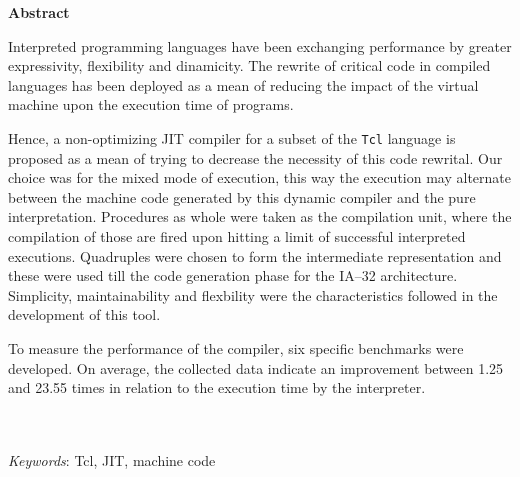 
{
\Large
\begin{center}
\textbf{Abstract}
\end{center}
}
Interpreted programming languages have been exchanging performance by
greater expressivity, flexibility and dinamicity. The rewrite of
critical code in compiled languages has been deployed as a mean of
reducing the impact of the virtual machine upon the execution time of
programs.

Hence, a non-optimizing JIT compiler for a subset of the \texttt{Tcl}
language is proposed as a mean of trying to decrease the necessity of
this code rewrital.
Our choice was for the mixed mode of execution, this way the execution
may alternate between the machine code generated by this dynamic compiler
and the pure interpretation.
Procedures as whole were taken as the compilation unit, where the
compilation of those are fired upon hitting a limit of successful interpreted
executions. Quadruples were chosen to form the intermediate representation
and these were used till the code generation phase for the IA--32
architecture.
Simplicity, maintainability and flexbility were the
characteristics followed in the development of this tool.

To measure the performance of the compiler, six specific benchmarks
were developed. On average, the collected data indicate an improvement
between 1.25 and 23.55 times in relation to the execution time by the
interpreter.

\quad\\
\quad\\
\textit{Keywords}: Tcl, JIT, machine code

\pagebreak
